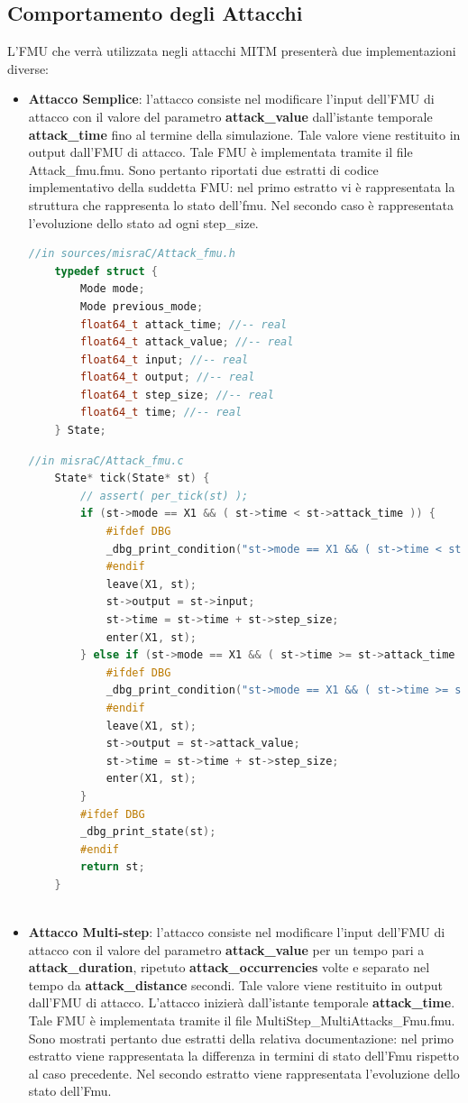 \subsection{Comportamento degli Attacchi}
L'FMU che verrà utilizzata negli attacchi MITM presenterà due implementazioni diverse:
\begin{itemize}
\item \textbf{Attacco Semplice}: l'attacco consiste nel modificare l'input dell'FMU di attacco con il valore del parametro \textbf{attack\_value} dall'istante temporale \textbf{attack\_time} fino al termine della simulazione. Tale valore viene restituito in output dall'FMU di attacco. Tale FMU è implementata tramite il file Attack\_fmu.fmu. Sono pertanto riportati due estratti di codice implementativo della suddetta FMU: nel primo estratto vi è rappresentata la struttura che rappresenta lo stato dell'fmu. Nel secondo caso è rappresentata l'evoluzione dello stato ad ogni step\_size.

\begin{lstlisting}[language=C++]
	//in sources/misraC/Attack_fmu.h
	typedef struct { 
		Mode mode;
		Mode previous_mode;
		float64_t attack_time; //-- real
		float64_t attack_value; //-- real
		float64_t input; //-- real
		float64_t output; //-- real
		float64_t step_size; //-- real
		float64_t time; //-- real
	} State;

\end{lstlisting}
\begin{lstlisting}[language=C++]
	//in misraC/Attack_fmu.c
	State* tick(State* st) {
		// assert( per_tick(st) );
		if (st->mode == X1 && ( st->time < st->attack_time )) {
			#ifdef DBG
			_dbg_print_condition("st->mode == X1 && ( st->time < st->attack_time )");
			#endif
			leave(X1, st);
			st->output = st->input;
			st->time = st->time + st->step_size;
			enter(X1, st);
		} else if (st->mode == X1 && ( st->time >= st->attack_time )) {
			#ifdef DBG
			_dbg_print_condition("st->mode == X1 && ( st->time >= st->attack_time )");
			#endif
			leave(X1, st);
			st->output = st->attack_value;
			st->time = st->time + st->step_size;
			enter(X1, st);
		}
		#ifdef DBG
		_dbg_print_state(st);
		#endif
		return st;
	}
	
\end{lstlisting}

\item \textbf{Attacco Multi-step}: l'attacco consiste nel modificare l'input dell'FMU di attacco con il valore del parametro \textbf{attack\_value} per un tempo pari a \textbf{attack\_duration}, ripetuto \textbf{attack\_occurrencies} volte e separato nel tempo da \textbf{attack\_distance} secondi. Tale valore viene restituito in output dall'FMU di attacco. L'attacco inizierà dall'istante temporale \textbf{attack\_time}. Tale FMU è implementata tramite il file MultiStep\_MultiAttacks\_Fmu.fmu. Sono mostrati pertanto due estratti della relativa documentazione: nel primo estratto viene rappresentata la differenza in termini di stato dell'Fmu rispetto al caso precedente. Nel secondo estratto viene rappresentata l'evoluzione dello stato dell'Fmu.

\end{itemize}

